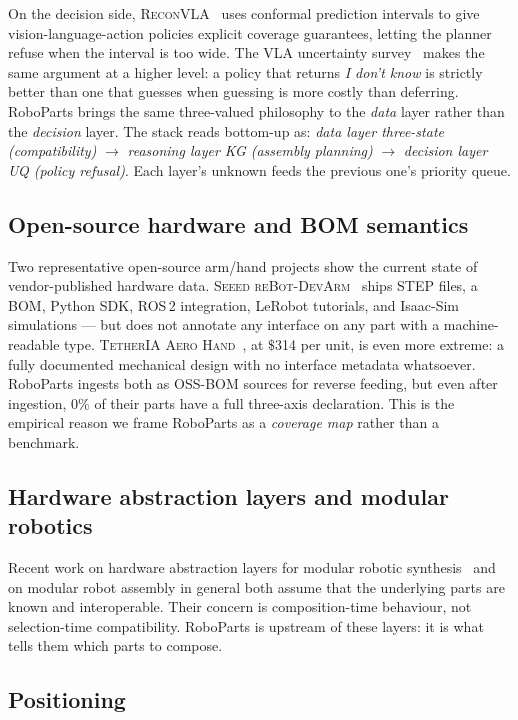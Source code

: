 \documentclass[review]{elsarticle}
\begin{document}
On the decision side, \textsc{ReconVLA}~\cite{R10} uses conformal
prediction intervals to give vision-language-action policies explicit
coverage guarantees, letting the planner refuse when the interval
is too wide. The VLA uncertainty survey~\cite{R11} makes the same
argument at a higher level: a policy that returns \emph{I don't know}
is strictly better than one that guesses when guessing is more
costly than deferring. RoboParts brings the same three-valued
philosophy to the \emph{data} layer rather than the \emph{decision}
layer. The stack reads bottom-up as: \emph{data layer three-state
(compatibility)} $\rightarrow$ \emph{reasoning layer KG (assembly
planning)} $\rightarrow$ \emph{decision layer UQ (policy refusal)}.
Each layer's unknown feeds the previous one's priority queue.

\subsection{Open-source hardware and BOM semantics}

Two representative open-source arm/hand projects show the current
state of vendor-published hardware data. \textsc{Seeed reBot-DevArm}~\cite{R14}
ships STEP files, a BOM, Python SDK, ROS\,2 integration, LeRobot
tutorials, and Isaac-Sim simulations — but does not annotate any
interface on any part with a machine-readable type. \textsc{TetherIA
Aero Hand}~\cite{R15}, at $\$$314 per unit, is even more extreme:
a fully documented mechanical design with no interface metadata
whatsoever. RoboParts ingests both as OSS-BOM sources for reverse
feeding, but even after ingestion, $0\%$ of their parts have a full
three-axis declaration. This is the empirical reason we frame RoboParts
as a \emph{coverage map} rather than a benchmark.

\subsection{Hardware abstraction layers and modular robotics}

Recent work on hardware abstraction layers for modular robotic
synthesis~\cite{R16} and on modular robot assembly in general both
assume that the underlying parts are known and interoperable. Their
concern is composition-time behaviour, not selection-time
compatibility. RoboParts is upstream of these layers: it is what
tells them which parts to compose.

\subsection{Positioning}
\end{document}
